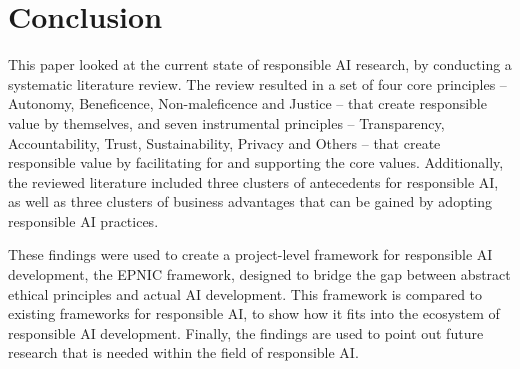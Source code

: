 \section{Conclusion}
\label{sec:Conclusion}

This paper looked at the current state of responsible AI research, by conducting a systematic literature review. The review resulted in a set of four core principles -- Autonomy, Beneficence, Non-maleficence and Justice -- that create responsible value by themselves, and seven instrumental principles -- Transparency, Accountability, Trust, Sustainability, Privacy and Others -- that create responsible value by facilitating for and supporting the core values. Additionally, the reviewed literature included three clusters of antecedents for responsible AI, as well as three clusters of business advantages that can be gained by adopting responsible AI practices.

These findings were used to create a project-level framework for responsible AI development, the EPNIC framework, designed to bridge the gap between abstract ethical principles and actual AI development. This framework is compared to existing frameworks for responsible AI, to show how it fits into the ecosystem of responsible AI development. Finally, the findings are used to point out future research that is needed within the field of responsible AI.
